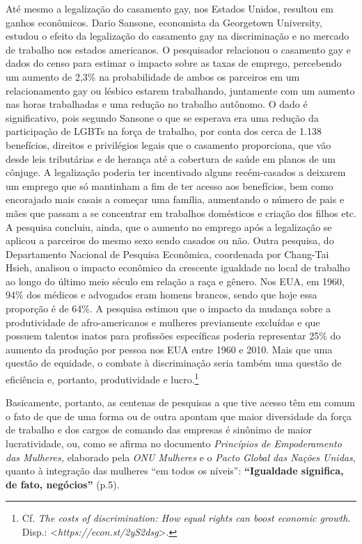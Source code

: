 Até mesmo a legalização do casamento gay, nos Estados Unidos, resultou
em ganhos econômicos. Dario Sansone, economista da Georgetown
University, estudou o efeito da legalização do casamento gay na
discriminação e no mercado de trabalho nos estados americanos. O
pesquisador relacionou o casamento gay e dados do censo para estimar o
impacto sobre as taxas de emprego, percebendo um aumento de 2,3\% na
probabilidade de ambos os parceiros em um relacionamento gay ou lésbico
estarem trabalhando, juntamente com um aumento nas horas trabalhadas e
uma redução no trabalho autônomo. O dado é significativo, pois segundo
Sansone o que se esperava era uma redução da participação de LGBTs na
força de trabalho, por conta dos cerca de 1.138 benefícios, direitos e
privilégios legais que o casamento proporciona, que vão desde leis
tributárias e de herança até a cobertura de saúde em planos de um
cônjuge. A legalização poderia ter incentivado alguns recém-casados ​​a
deixarem um emprego que só mantinham a fim de ter acesso aos benefícios,
bem como encorajado mais casais a começar uma família, aumentando o
número de pais e mães que passam a se concentrar em trabalhos domésticos
e criação dos filhos etc. A pesquisa concluiu, ainda, que o aumento no
emprego após a legalização se aplicou a parceiros do mesmo sexo sendo
casados ​ou não. Outra pesquisa, do Departamento Nacional de Pesquisa
Econômica, coordenada por Chang-Tai Hsieh, analisou o impacto econômico
da crescente igualdade no local de trabalho ao longo do último meio
século em relação a raça e gênero. Nos EUA, em 1960, 94\% dos médicos e
advogados eram homens brancos, sendo que hoje essa proporção é de 64\%.
A pesquisa estimou que o impacto da mudança sobre a produtividade de
afro-americanos e mulheres previamente excluídas e que possuem talentos
inatos para profissões específicas poderia representar 25\% do aumento
da produção por pessoa nos EUA entre 1960 e 2010. Mais que uma questão
de equidade, o combate à discriminação seria também uma questão de
eficiência e, portanto, produtividade e lucro.\footnote{Cf. \emph{The
  costs of discrimination: How equal rights can boost economic growth}.
  Disp.: \textless{}\emph{https://econ.st/2yS2dsg}\textgreater{}.}

Basicamente, portanto, as centenas de pesquisas a que tive acesso têm em
comum o fato de que de uma forma ou de outra apontam que maior
diversidade da força de trabalho e dos cargos de comando das empresas é
sinônimo de maior lucratividade, ou, como se afirma no documento
\emph{Princípios de Empoderamento das Mulheres,} elaborado pela
\emph{ONU Mulheres} e o \emph{Pacto Global das Nações Unidas}, quanto à
integração das mulheres ``em todos os níveis'': \textbf{``Igualdade
significa, de fato, negócios''} (p.5).

